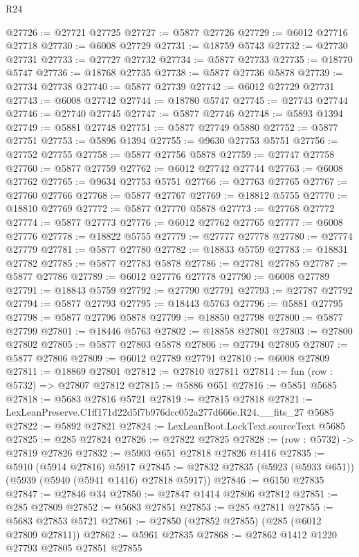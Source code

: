 \begin{lexlean}{R24}
\begin{coremodule}
@27726 := @27721 @27725
@27727 := @5877 @27726
@27729 := @6012 @27716 @27718
@27730 := @6008 @27729
@27731 := @18759 @5743
@27732 := @27730 @27731
@27733 := @27727 @27732
@27734 := @5877 @27733
@27735 := @18770 @5747
@27736 := @18768 @27735
@27738 := @5877 @27736 @5878
@27739 := @27734 @27738
@27740 := @5877 @27739
@27742 := @6012 @27729 @27731
@27743 := @6008 @27742
@27744 := @18780 @5747
@27745 := @27743 @27744
@27746 := @27740 @27745
@27747 := @5877 @27746
@27748 := @5893 @1394
@27749 := @5881 @27748
@27751 := @5877 @27749 @5880
@27752 := @5877 @27751
@27753 := @5896 @1394
@27755 := @9630 @27753 @5751
@27756 := @27752 @27755
@27758 := @5877 @27756 @5878
@27759 := @27747 @27758
@27760 := @5877 @27759
@27762 := @6012 @27742 @27744
@27763 := @6008 @27762
@27765 := @9634 @27753 @5751
@27766 := @27763 @27765
@27767 := @27760 @27766
@27768 := @5877 @27767
@27769 := @18812 @5755
@27770 := @18810 @27769
@27772 := @5877 @27770 @5878
@27773 := @27768 @27772
@27774 := @5877 @27773
@27776 := @6012 @27762 @27765
@27777 := @6008 @27776
@27778 := @18822 @5755
@27779 := @27777 @27778
@27780 := @27774 @27779
@27781 := @5877 @27780
@27782 := @18833 @5759
@27783 := @18831 @27782
@27785 := @5877 @27783 @5878
@27786 := @27781 @27785
@27787 := @5877 @27786
@27789 := @6012 @27776 @27778
@27790 := @6008 @27789
@27791 := @18843 @5759
@27792 := @27790 @27791
@27793 := @27787 @27792
@27794 := @5877 @27793
@27795 := @18443 @5763
@27796 := @5881 @27795
@27798 := @5877 @27796 @5878
@27799 := @18850 @27798
@27800 := @5877 @27799
@27801 := @18446 @5763
@27802 := @18858 @27801
@27803 := @27800 @27802
@27805 := @5877 @27803 @5878
@27806 := @27794 @27805
@27807 := @5877 @27806
@27809 := @6012 @27789 @27791
@27810 := @6008 @27809
@27811 := @18869 @27801
@27812 := @27810 @27811
@27814 := fun (row : @5732) => @27807 @27812
@27815 := @5886 @651
@27816 := @5851 @5685
@27818 := @5683 @27816 @5721
@27819 := @27815 @27818
@27821 := LexLeanPreserve.C1ff171d22d5f7b976dcc052a277d666e.R24.__fits_27 @5685
@27822 := @5892 @27821
@27824 := LexLeanBoot.LockText.sourceText @5685
@27825 := @285 @27824
@27826 := @27822 @27825
@27828 := (row : @5732) -> @27819 @27826
@27832 := @5903 @651 @27818 @27826 @1416
@27835 := @5910 (@5914 @27816) @5917
@27845 := @27832 @27835 (@5923 (@5933 @651)) (@5939 (@5940 (@5941 @1416) @27818 @5917))
@27846 := @6150 @27835
@27847 := @27846 @34
@27850 := @27847 @1414 @27806 @27812
@27851 := @285 @27809
@27852 := @5683 @27851
@27853 := @285 @27811
@27855 := @5683 @27853 @5721
@27861 := @27850 (@27852 @27855) (@285 (@6012 @27809 @27811))
@27862 := @5961 @27835
@27868 := @27862 @1412 @1220 @27793 @27805 @27851 @27855

\end{coremodule}
\end{lexlean}
